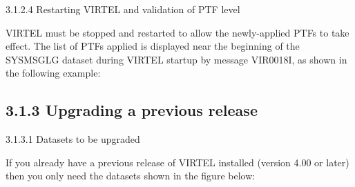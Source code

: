 \documentclass[letterpaper,10pt,english]{sphinxmanual}
\begin{document}

3.1.2.4 Restarting VIRTEL and validation of PTF level

VIRTEL must be stopped and restarted to allow the newly-applied PTFs to take effect. The list of PTFs applied is displayed near the beginning of the SYSMSGLG dataset during VIRTEL startup by message VIR0018I, as shown in the following example:

\begin{sphinxVerbatim}[commandchars=\\\{\}]
     

     
\end{sphinxVerbatim}


\subsection{3.1.3 Upgrading a previous release}
\label{\detokenize{Installation_Guide:upgrading-a-previous-release}}
3.1.3.1 Datasets to be upgraded

If you already have a previous release of VIRTEL installed (version 4.00 or later) then you only need the datasets shown in the figure below:

\begin{sphinxVerbatim}[commandchars=\\\{\}]
\end{sphinxVerbatim}
\end{document}
